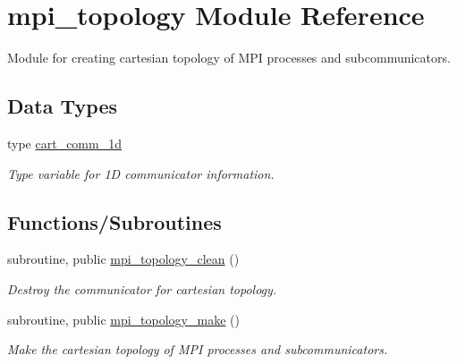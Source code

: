 \hypertarget{namespacempi__topology}{}\section{mpi\+\_\+topology Module Reference}
\label{namespacempi__topology}


Module for creating cartesian topology of M\+PI processes and subcommunicators.  


\subsection*{Data Types}
\begin{DoxyCompactItemize}
\item 
type \mbox{\hyperlink{structmpi__topology_1_1cart__comm__1d}{cart\+\_\+comm\+\_\+1d}}
\begin{DoxyCompactList}\small\item\em Type variable for 1D communicator information. \end{DoxyCompactList}\end{DoxyCompactItemize}
\subsection*{Functions/\+Subroutines}
\begin{DoxyCompactItemize}
\item 
subroutine, public \mbox{\hyperlink{namespacempi__topology_aa14e91baaec6d1c1082ebd5ac6e19128}{mpi\+\_\+topology\+\_\+clean}} ()
\begin{DoxyCompactList}\small\item\em Destroy the communicator for cartesian topology. \end{DoxyCompactList}\item 
subroutine, public \mbox{\hyperlink{namespacempi__topology_a8819f16f50aded913f17520a29d3ec4c}{mpi\+\_\+topology\+\_\+make}} ()
\begin{DoxyCompactList}\small\item\em Make the cartesian topology of M\+PI processes and subcommunicators. \end{DoxyCompactList}\end{DoxyCompactItemize}
